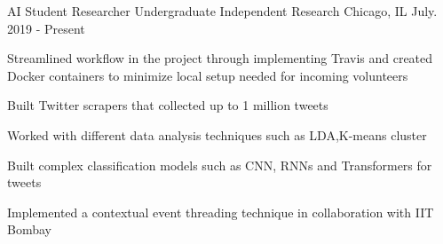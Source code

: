 \begin{cventries}
  \cventry
    {AI Student Researcher} %
    {Undergraduate Independent Research} %
    {Chicago, IL} %
    {July. 2019 - Present} %
    {
      \begin{cvitems} %
        \item {Streamlined workflow in the project through implementing Travis and created Docker containers to minimize local setup needed for incoming volunteers}
        \item {Built Twitter scrapers that collected up to 1 million tweets}
        \item {Worked with different data analysis techniques such as LDA,K-means cluster}
        \item {Built complex classification models such as CNN, RNNs and Transformers for tweets}
        \item {Implemented a contextual event threading technique in collaboration with IIT Bombay}
      \end{cvitems}
    }


  

\end{cventries}

